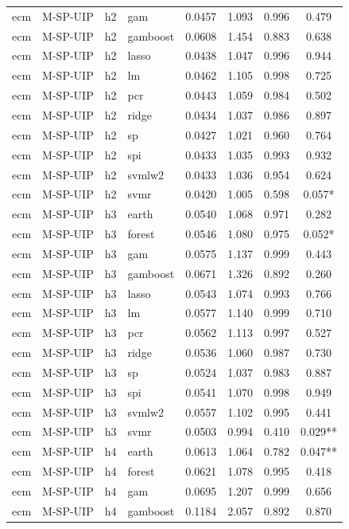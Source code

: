 \begin{ThreePartTable}
\begin{longtable}[t]{llclcccc}
ecm & M-SP-UIP & h2 & gam & 0.0457 & 1.093 & 0.996 & 0.479\\
ecm & M-SP-UIP & h2 & gamboost & 0.0608 & 1.454 & 0.883 & 0.638\\
ecm & M-SP-UIP & h2 & lasso & 0.0438 & 1.047 & 0.996 & 0.944\\
ecm & M-SP-UIP & h2 & lm & 0.0462 & 1.105 & 0.998 & 0.725\\
ecm & M-SP-UIP & h2 & pcr & 0.0443 & 1.059 & 0.984 & 0.502\\
ecm & M-SP-UIP & h2 & ridge & 0.0434 & 1.037 & 0.986 & 0.897\\
ecm & M-SP-UIP & h2 & sp & 0.0427 & 1.021 & 0.960 & 0.764\\
ecm & M-SP-UIP & h2 & spi & 0.0433 & 1.035 & 0.993 & 0.932\\
ecm & M-SP-UIP & h2 & svmlw2 & 0.0433 & 1.036 & 0.954 & 0.624\\
ecm & M-SP-UIP & h2 & svmr & 0.0420 & 1.005 & 0.598 & 0.057*\\
\addlinespace
ecm & M-SP-UIP & h3 & earth & 0.0540 & 1.068 & 0.971 & 0.282\\
ecm & M-SP-UIP & h3 & forest & 0.0546 & 1.080 & 0.975 & 0.052*\\
ecm & M-SP-UIP & h3 & gam & 0.0575 & 1.137 & 0.999 & 0.443\\
ecm & M-SP-UIP & h3 & gamboost & 0.0671 & 1.326 & 0.892 & 0.260\\
ecm & M-SP-UIP & h3 & lasso & 0.0543 & 1.074 & 0.993 & 0.766\\
ecm & M-SP-UIP & h3 & lm & 0.0577 & 1.140 & 0.999 & 0.710\\
ecm & M-SP-UIP & h3 & pcr & 0.0562 & 1.113 & 0.997 & 0.527\\
ecm & M-SP-UIP & h3 & ridge & 0.0536 & 1.060 & 0.987 & 0.730\\
ecm & M-SP-UIP & h3 & sp & 0.0524 & 1.037 & 0.983 & 0.887\\
ecm & M-SP-UIP & h3 & spi & 0.0541 & 1.070 & 0.998 & 0.949\\
ecm & M-SP-UIP & h3 & svmlw2 & 0.0557 & 1.102 & 0.995 & 0.441\\
ecm & M-SP-UIP & h3 & svmr & 0.0503 & 0.994 & 0.410 & 0.029**\\
\addlinespace
ecm & M-SP-UIP & h4 & earth & 0.0613 & 1.064 & 0.782 & 0.047**\\
ecm & M-SP-UIP & h4 & forest & 0.0621 & 1.078 & 0.995 & 0.418\\
ecm & M-SP-UIP & h4 & gam & 0.0695 & 1.207 & 0.999 & 0.656\\
ecm & M-SP-UIP & h4 & gamboost & 0.1184 & 2.057 & 0.892 & 0.870\\

\end{longtable}
\end{ThreePartTable}
